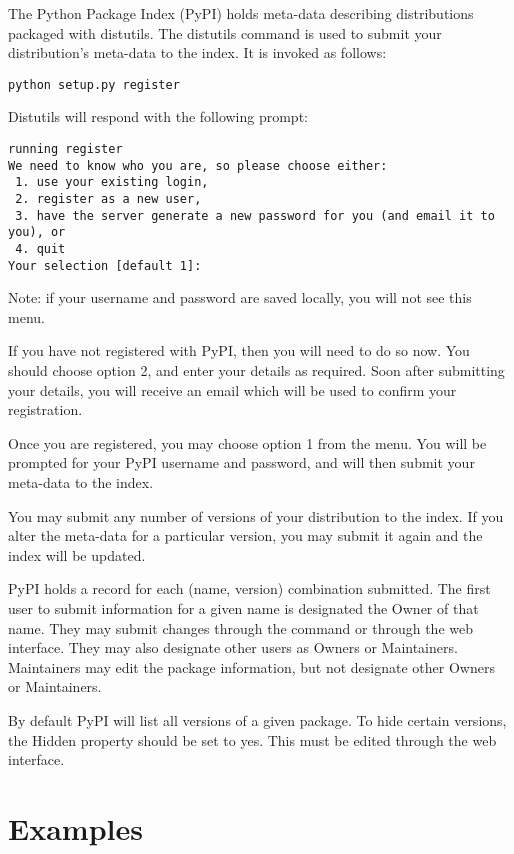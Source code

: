 \documentclass{manual}
\begin{document}
The Python Package Index (PyPI) holds meta-data describing distributions
packaged with distutils. The distutils command  is
used to submit your distribution's meta-data to the index. It is invoked
as follows:

\begin{verbatim}
python setup.py register
\end{verbatim}

Distutils will respond with the following prompt:

\begin{verbatim}
running register
We need to know who you are, so please choose either:
 1. use your existing login,
 2. register as a new user,
 3. have the server generate a new password for you (and email it to you), or
 4. quit
Your selection [default 1]:
\end{verbatim}

\noindent Note: if your username and password are saved locally, you will
not see this menu.

If you have not registered with PyPI, then you will need to do so now. You
should choose option 2, and enter your details as required. Soon after
submitting your details, you will receive an email which will be used to
confirm your registration.

Once you are registered, you may choose option 1 from the menu. You will
be prompted for your PyPI username and password, and 
will then submit your meta-data to the index.

You may submit any number of versions of your distribution to the index. If
you alter the meta-data for a particular version, you may submit it again
and the index will be updated.

PyPI holds a record for each (name, version) combination submitted. The
first user to submit information for a given name is designated the Owner
of that name. They may submit changes through the 
command or through the web interface. They may also designate other users
as Owners or Maintainers. Maintainers may edit the package information, but
not designate other Owners or Maintainers.

By default PyPI will list all versions of a given package. To hide certain
versions, the Hidden property should be set to yes. This must be edited
through the web interface.



\chapter{Examples}
\label{examples}
\end{document}
